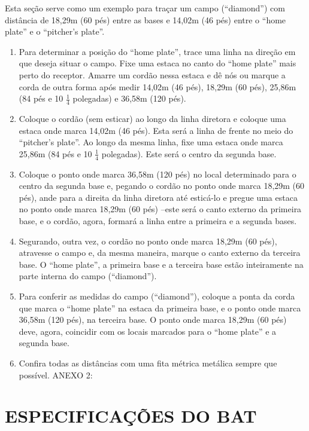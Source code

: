 \begin{multicols}{2}
	Esta seção serve como um exemplo para traçar um campo (“diamond”) com distância
	de 18,29m (60 pés) entre as bases e 14,02m (46 pés) entre o “home plate” e o
	“pitcher’s plate”.
	\begin{enumerate}[label= \arabic*)]
		\item  Para determinar a posição do “home plate”, trace uma linha na direção em que
		deseja situar o campo. Fixe uma estaca no canto do “home plate” mais perto do
		receptor. Amarre um cordão nessa estaca e dê nós ou marque a corda de outra forma
		após medir 14,02m (46 pés), 18,29m (60 pés), 25,86m (84 pés e 10 $\frac{1}{4}$ polegadas) e
		36,58m (120 pés).
		\item  Coloque o cordão (sem esticar) ao longo da linha diretora e coloque uma estaca
		onde marca 14,02m (46 pés). Esta será a linha de frente no meio do “pitcher’s plate”.
		Ao longo da mesma linha, fixe uma estaca onde marca 25,86m (84 pés e 10 $\frac{1}{4}$
		polegadas). Este será o centro da segunda base.
		\item  Coloque o ponto onde marca 36,58m (120 pés) no local determinado para o centro
		da segunda base e, pegando o cordão no ponto onde marca 18,29m (60 pés), ande
		para a direita da linha diretora até esticá-lo e pregue uma estaca no ponto onde marca
		18,29m (60 pés) –este será o canto externo da primeira base, e o cordão, agora,
		formará a linha entre a primeira e a segunda bases.
		\item  Segurando, outra vez, o cordão no ponto onde marca 18,29m (60 pés), atravesse o
		campo e, da mesma maneira, marque o canto externo da terceira base. O “home
		plate”, a primeira base e a terceira base estão inteiramente na parte interna do campo
		(“diamond”).
		\item  Para conferir as medidas do campo (“diamond”), coloque a ponta da corda que
		marca o “home plate” na estaca da primeira base, e o ponto onde marca 36,58m (120
		pés), na terceira base. O ponto onde marca 18,29m (60 pés) deve, agora, coincidir com
		os locais marcados para o “home plate” e a segunda base.
		\item  Confira todas as distâncias com uma fita métrica metálica sempre que possível. ANEXO 2:
	\end{enumerate}
\end{multicols}


\chapter{ESPECIFICAÇÕES DO BAT}


